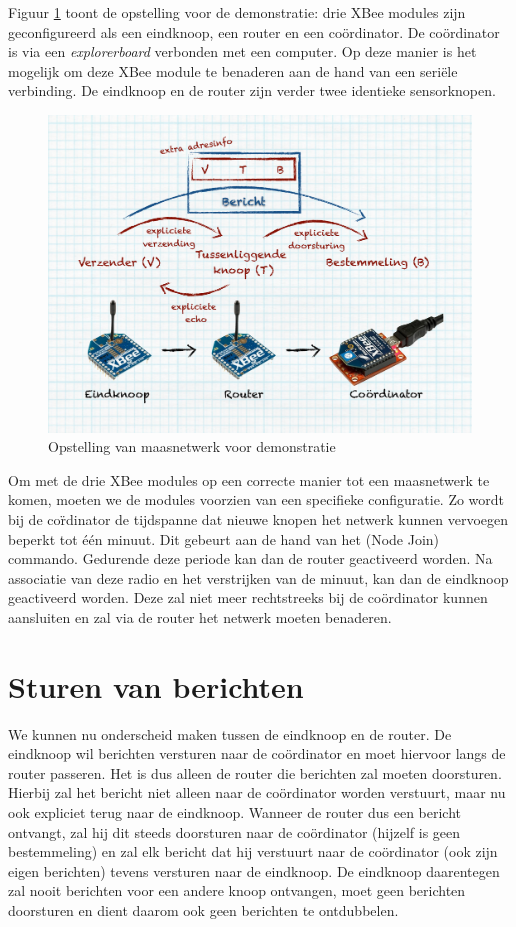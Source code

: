 Figuur \ref{fig:xbee-setup} toont de opstelling voor de demonstratie: drie XBee
modules zijn geconfigureerd als een eindknoop, een router en een
co\"ordinator. De co\"ordinator is via een \emph{explorerboard} verbonden met
een computer. Op deze manier is het mogelijk om deze XBee module te benaderen
aan de hand van een seri\"ele verbinding. De eindknoop en de router zijn
verder twee identieke sensorknopen.

\begin{figure}[ht]
  \centering
  \includegraphics[width=0.9\linewidth]{resources/xbee-setup.pdf}
  \caption{Opstelling van maasnetwerk voor demonstratie}
  \label{fig:xbee-setup}
\end{figure}

Om met de drie XBee modules op een correcte manier tot een maasnetwerk te
komen, moeten we de modules voorzien van een specifieke configuratie. Zo wordt
bij de co\"rdinator de tijdspanne dat nieuwe knopen het netwerk kunnen
vervoegen beperkt tot \'e\'en minuut. Dit gebeurt aan de hand van het 
(Node Join) commando. Gedurende deze periode kan dan de router geactiveerd
worden. Na associatie van deze radio en het verstrijken van de minuut, kan dan
de eindknoop geactiveerd worden. Deze zal niet meer rechtstreeks bij de
co\"ordinator kunnen aansluiten en zal via de router het netwerk moeten
benaderen.

\section{Sturen van berichten}

We kunnen nu onderscheid maken tussen de eindknoop en de router. De eindknoop
wil berichten versturen naar de co\"ordinator en moet hiervoor langs de router
passeren. Het is dus alleen de router die berichten zal moeten doorsturen.
Hierbij zal het bericht niet alleen naar de co\"ordinator worden verstuurt, maar
nu ook expliciet terug naar de eindknoop. Wanneer de router dus een bericht
ontvangt, zal hij dit steeds doorsturen naar de co\"ordinator (hijzelf is geen
bestemmeling) en zal elk bericht dat hij verstuurt naar de co\"ordinator (ook
zijn eigen berichten) tevens versturen naar de eindknoop. De eindknoop
daarentegen zal nooit berichten voor een andere knoop ontvangen, moet geen
berichten doorsturen en dient daarom ook geen berichten te ontdubbelen.

